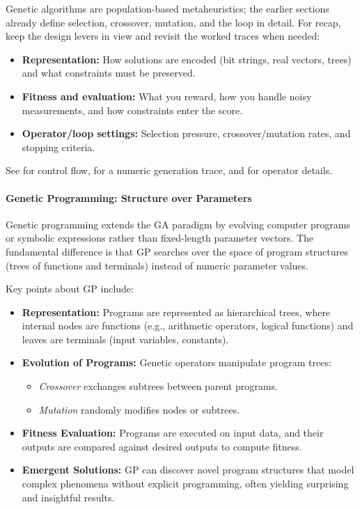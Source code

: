 Genetic algorithms are population-based metaheuristics; the earlier sections already define selection, crossover, mutation, and the loop in detail. For recap, keep the design levers in view and revisit the worked traces when needed:
\begin{itemize}
    \item \textbf{Representation:} How solutions are encoded (bit strings, real vectors, trees) and what constraints must be preserved.
    \item \textbf{Fitness and evaluation:} What you reward, how you handle noisy measurements, and how constraints enter the score.
    \item \textbf{Operator/loop settings:} Selection pressure, crossover/mutation rates, and stopping criteria.
\end{itemize}
See  for control flow,  for a numeric generation trace, and  for operator details.

\paragraph{Genetic Programming: Structure over Parameters}

Genetic programming extends the GA paradigm by evolving computer programs or symbolic expressions rather than fixed-length parameter vectors. The fundamental difference is that GP searches over the space of program structures (trees of functions and terminals) instead of numeric parameter values.

Key points about GP include:

\begin{itemize}
    \item \textbf{Representation:} Programs are represented as hierarchical trees, where internal nodes are functions (e.g., arithmetic operators, logical functions) and leaves are terminals (input variables, constants).
    \item \textbf{Evolution of Programs:} Genetic operators manipulate program trees:
    \begin{itemize}
        \item \emph{Crossover} exchanges subtrees between parent programs.
        \item \emph{Mutation} randomly modifies nodes or subtrees.
    \end{itemize}
    \item \textbf{Fitness Evaluation:} Programs are executed on input data, and their outputs are compared against desired outputs to compute fitness.
    \item \textbf{Emergent Solutions:} GP can discover novel program structures that model complex phenomena without explicit programming, often yielding surprising and insightful results.
\end{itemize}

